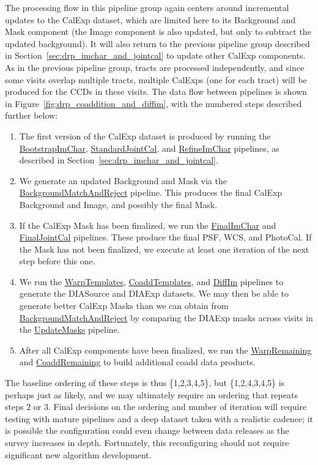 The processing flow in this pipeline group again centers around incremental updates to the CalExp dataset, which are limited here to its Background and Mask component (the Image component is also updated, but only to subtract the updated background).  It will also return to the previous pipeline group described in Section~\ref{sec:drp_imchar_and_jointcal} to update other CalExp components.  As in the previous pipeline group, tracts are processed independently, and since some visits overlap multiple tracts, multiple CalExps (one for each tract) will be produced for the CCDs in these visits. The data flow between pipelines is shown in Figure~\ref{fig:drp_coaddition_and_diffim}, with the numbered steps described further below:
\begin{enumerate} %
\item The first version of the CalExp dataset is produced by running the \hyperref[sec:drpBootstrapImChar]{BootstrapImChar}, \hyperref[sec:drpStandardJointCal]{StandardJointCal}, and \hyperref[sec:drpRefineImChar]{RefineImChar} pipelines, as described in Section~\ref{sec:drp_imchar_and_jointcal}.
\item We generate an updated Background and Mask via the \hyperref[sec:drpBackgroundMatchAndReject]{BackgroundMatchAndReject} pipeline.  This produces the final CalExp Background and Image, and possibly the final Mask.
\item If the CalExp Mask has been finalized, we run the \hyperref[sec:drpFinalImChar]{FinalImChar} and \hyperref[sec:drpFinalJointCal]{FinalJointCal} pipelines.  These produce the final PSF, WCS, and PhotoCal.  If the Mask has not been finalized, we execute at least one iteration of the next step before this one.
\item We run the \hyperref[sec:drpWarpTemplates]{WarpTemplates}, \hyperref[sec:drpCoaddTemplates]{CoaddTemplates}, and \hyperref[sec:drpDiffIm]{DiffIm} pipelines to generate the DIASource and DIAExp datasets.  We may then be able to generate better CalExp Masks than we can obtain from \hyperref[sec:drpBackgroundMatchAndReject]{BackgroundMatchAndReject} by comparing the DIAExp masks across visits in the \hyperref[sec:drpUpdateMasks]{UpdateMasks} pipeline.
\item After all CalExp components have been finalized, we run the \hyperref[sec:drpWarpRemaining]{WarpRemaining} and \hyperref[sec:drpCoaddRemaining]{CoaddRemaining} to build additional coadd data products.
\end{enumerate}
The baseline ordering of these steps is thus \{1,2,3,4,5\}, but \{1,2,4,3,4,5\} is perhaps just as likely, and we may ultimately require an ordering that repeats steps 2 or 3.  Final decisions on the ordering and number of iteration will require testing with mature pipelines and a deep dataset taken with a realistic cadence; it is possible the configuration could even change between data releases as the survey increases in depth.  Fortunately, this reconfiguring should not require significant new algorithm development.

